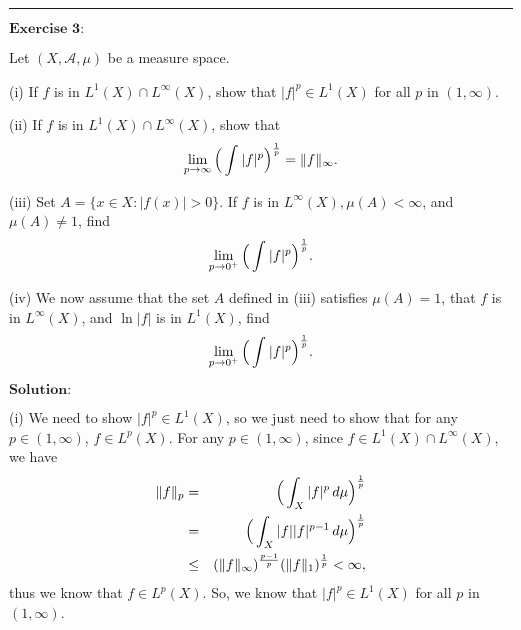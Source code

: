 \documentclass[12pt]{article}
\begin{document}
\noindent\rule[0.25\baselineskip]{\textwidth}{0.5pt}

\vspace{8pt}

$\textbf{Exercise 3:}$

Let $(X, \mathcal{A}, \mu)$ be a measure space.

(i) If $f$ is in $L^{1}(X) \cap L^{\infty}(X)$, show that $|f|^{p} \in L^{1}(X)$ for all $p$ in $(1, \infty)$.

(ii) If $f$ is in $L^{1}(X) \cap L^{\infty}(X)$, show that
\begin{equation*}
    \lim_{p \to \infty} \Big{(} \int_{}^{} |f|^{p} \Big{)}^{\frac{1}{p}} = \|f\|_{\infty}.
\end{equation*}

(iii) Set $A = \{x \in X: |f(x)| > 0\}$. If $f$ is in $L^{\infty} (X), \mu(A) < \infty$, and $\mu(A) \neq 1$, find
\begin{equation*}
    \lim_{p \to 0^{+}} \Big{(} \int_{}^{} |f|^{p} \Big{)}^{\frac{1}{p}}.
\end{equation*}

(iv) We now assume that the set $A$ defined in (iii) satisfies $\mu(A) = 1$, that $f$ is in $L^{\infty}(X)$, and $\ln |f|$ is in $L^{1}(X)$, find
\begin{equation*}
    \lim_{p \to 0^{+}} \Big{(} \int_{}^{} |f|^{p} \Big{)}^{\frac{1}{p}}.
\end{equation*}

\vspace{8pt}
$\textbf{Solution:}$

(i) We need to show $|f|^{p} \in L^{1}(X)$, so we just need to show that for any $p \in (1, \infty)$, $f \in L^{p}(X)$. For any $p \in (1, \infty)$, since $f \in L^{1}(X) \cap L^{\infty}(X)$, we have
\begin{eqnarray*}
    \|f\|_{p} &=& \Big{(} \int_{X}^{} |f|^{p} \, d \mu \Big{)}^{\frac{1}{p}} \\
    &=& \Big{(} \int_{X}^{} |f| |f|^{p-1} \, d \mu \Big{)}^{\frac{1}{p}} \\
    & \leq &  (\|f\|_{\infty})^{\frac{p-1}{p}} (\|f\|_{1})^{\frac{1}{p}} < \infty,
\end{eqnarray*}
thus we know that $f \in L^{p}(X)$. So, we know that $|f|^{p} \in L^{1}(X)$ for all $p$ in $(1, \infty)$.

\vspace{8pt}
\end{document}
